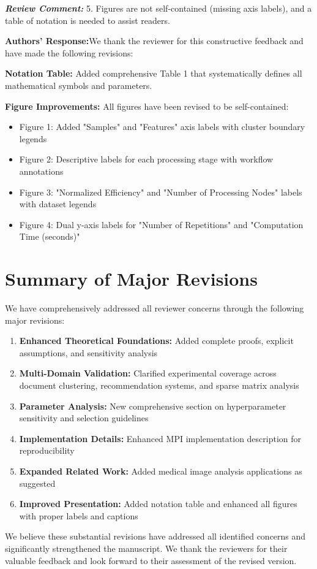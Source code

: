\documentclass{ar2rc}
\renewcommand{\RC}[1]{\textbf{\textit{Review Comment:}} #1}
\renewcommand{\AR}{\textbf{Authors' Response:}}
\begin{document}
\RC{5. Figures are not self-contained (missing axis labels), and a table of notation is needed to assist readers.}

\AR We thank the reviewer for this constructive feedback and have made the following revisions:

\textbf{Notation Table:} Added comprehensive Table 1 that systematically defines all mathematical symbols and parameters.

\textbf{Figure Improvements:} All figures have been revised to be self-contained:
\begin{itemize}
  \item Figure 1: Added "Samples" and "Features" axis labels with cluster boundary legends
  \item Figure 2: Descriptive labels for each processing stage with workflow annotations
  \item Figure 3: "Normalized Efficiency" and "Number of Processing Nodes" labels with dataset legends
  \item Figure 4: Dual y-axis labels for "Number of Repetitions" and "Computation Time (seconds)"
\end{itemize}


\section{Summary of Major Revisions}

We have comprehensively addressed all reviewer concerns through the following major revisions:

\begin{enumerate}
  \item \textbf{Enhanced Theoretical Foundations:} Added complete proofs, explicit assumptions, and sensitivity analysis
  \item \textbf{Multi-Domain Validation:} Clarified experimental coverage across document clustering, recommendation systems, and sparse matrix analysis
  \item \textbf{Parameter Analysis:} New comprehensive section on hyperparameter sensitivity and selection guidelines
  \item \textbf{Implementation Details:} Enhanced MPI implementation description for reproducibility
  \item \textbf{Expanded Related Work:} Added medical image analysis applications as suggested
  \item \textbf{Improved Presentation:} Added notation table and enhanced all figures with proper labels and captions
\end{enumerate}

We believe these substantial revisions have addressed all identified concerns and significantly strengthened the manuscript. We thank the reviewers for their valuable feedback and look forward to their assessment of the revised version.

\printbibliography
\end{document}
